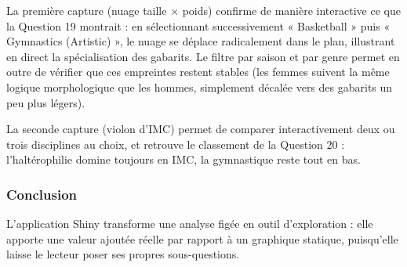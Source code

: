 \documentclass[
]{article}
\begin{document}
La première capture (nuage taille × poids) confirme de manière
interactive ce que la Question 19 montrait : en sélectionnant
successivement « Basketball » puis « Gymnastics (Artistic) », le nuage
se déplace radicalement dans le plan, illustrant en direct la
spécialisation des gabarits. Le filtre par saison et par genre permet en
outre de vérifier que ces empreintes restent stables (les femmes suivent
la même logique morphologique que les hommes, simplement décalée vers
des gabarits un peu plus légers).

La seconde capture (violon d'IMC) permet de comparer interactivement
deux ou trois disciplines au choix, et retrouve le classement de la
Question 20 : l'haltérophilie domine toujours en IMC, la gymnastique
reste tout en bas.

\subsubsection{Conclusion}\label{conclusion-6}

L'application Shiny transforme une analyse figée en outil d'exploration
: elle apporte une valeur ajoutée réelle par rapport à un graphique
statique, puisqu'elle laisse le lecteur poser ses propres
sous-questions.
\end{document}
